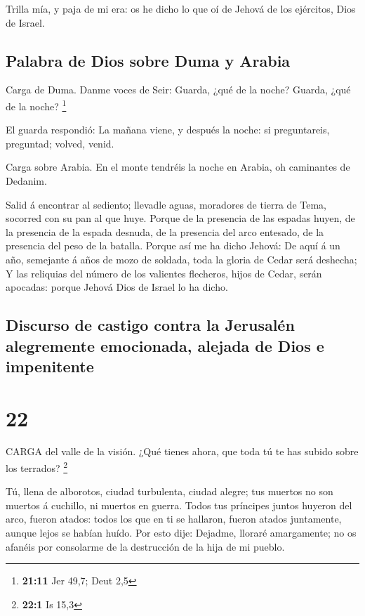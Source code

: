  Trilla mía, y paja de mi era: os he dicho lo que oí de
Jehová de los ejércitos, Dios de Israel.

\hypertarget{palabra-de-dios-sobre-duma-y-arabia}{%
\subsection{Palabra de Dios sobre Duma y
Arabia}\label{palabra-de-dios-sobre-duma-y-arabia}}

 Carga de Duma. Danme voces de Seir: Guarda, ¿qué de la
noche? Guarda, ¿qué de la noche? \footnote{\textbf{21:11} Jer 49,7; Deut
  2,5}

 El guarda respondió: La mañana viene, y después la noche:
si preguntareis, preguntad; volved, venid.

 Carga sobre Arabia. En el monte tendréis la noche en
Arabia, oh caminantes de Dedanim.

 Salid á encontrar al sediento; llevadle aguas, moradores
de tierra de Tema, socorred con su pan al que huye.  Porque
de la presencia de las espadas huyen, de la presencia de la espada
desnuda, de la presencia del arco entesado, de la presencia del peso de
la batalla.  Porque así me ha dicho Jehová: De aquí á un
año, semejante á años de mozo de soldada, toda la gloria de Cedar será
deshecha;  Y las reliquias del número de los valientes
flecheros, hijos de Cedar, serán apocadas: porque Jehová Dios de Israel
lo ha dicho.

\hypertarget{discurso-de-castigo-contra-la-jerusaluxe9n-alegremente-emocionada-alejada-de-dios-e-impenitente}{%
\subsection{Discurso de castigo contra la Jerusalén alegremente
emocionada, alejada de Dios e
impenitente}\label{discurso-de-castigo-contra-la-jerusaluxe9n-alegremente-emocionada-alejada-de-dios-e-impenitente}}

\hypertarget{section-21}{%
\section{22}\label{section-21}}

 CARGA del valle de la visión. ¿Qué tienes ahora, que toda
tú te has subido sobre los terrados? \footnote{\textbf{22:1} Is 15,3}

 Tú, llena de alborotos, ciudad turbulenta, ciudad alegre;
tus muertos no son muertos á cuchillo, ni muertos en guerra.
 Todos tus príncipes juntos huyeron del arco, fueron atados:
todos los que en ti se hallaron, fueron atados juntamente, aunque lejos
se habían huído.  Por esto dije: Dejadme, lloraré
amargamente; no os afanéis por consolarme de la destrucción de la hija
de mi pueblo.


